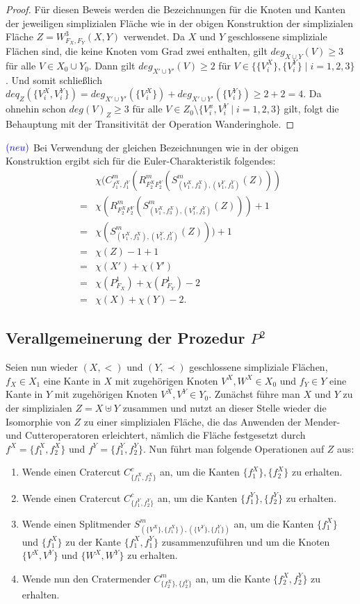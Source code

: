 \documentclass[12pt,titlepage]{article}
\begin{document}
 \begin{proof}
 Für diesen Beweis werden die Bezeichnungen für die Knoten und Kanten der jeweiligen simplizialen Fläche wie in der obigen Konstruktion der simplizialen Fläche $Z=W^3_{F_X,F_Y}(X,Y)$ verwendet.
 Da $X$ und $Y$ geschlossene simpliziale Flächen sind, die keine Knoten vom Grad zwei enthalten, gilt $deg_{X \cup Y}(V)\geq 3$ für alle $V\in X_0 \cup Y_0$.
  Dann gilt $deg_{X'\cup Y'}(V)\geq 2$ für $V \in \{\{V_i^X\},\{V_i^Y\}\mid i=1,2,3\}$. Und somit schließlich $deq_Z(\{V^X_i,V_i^Y\})=deg_{X'\cup Y'}(\{V_i^X\})+deg_{X'\cup Y'}(\{V_i^Y\})\geq 2+2=4$.
   Da ohnehin schon $deg(V)_Z\geq 3$ für alle $V\in Z_0\setminus \{V_i^x,V_i^Y\mid i=1,2,3\}$ gilt, folgt die Behauptung mit der Transitivität der Operation Wanderinghole.
 \end{proof}
$\textcolor{blue}{(neu)}$
Bei Verwendung der gleichen Bezeichnungen wie in der obigen Konstruktion ergibt sich für die Euler-Charakteristik folgendes:
\begin{align*}
&\chi(C^m_{f_1^X,f_1^Y}(R^m_{F_2^X F_2^Y}(S^m_{(V_1^X,f_3^X),(V_1^Y,f_3^Y)}(Z)))\\
=&\chi(R^m_{F_2^X F_2^Y}(S^m_{(V_1^X,f_3^X),(V_1^Y,f_3^Y)}(Z)))+1\\
=&\chi(S^m_{(V_1^X,f_3^X),(V_1^Y,f_3^Y)}(Z)))+1\\
=&\chi(Z)-1+1\\
=&\chi(X')+\chi(Y')\\
=&\chi(P^1_{F_X})+\chi(P^1_{F_Y})-2\\
=&\chi(X)+ \chi(Y)-2.
\end{align*}

  \subsection{Verallgemeinerung der Prozedur $P^2$}
Seien nun wieder $(X,<)$ und $(Y,\prec)$ geschlossene simpliziale Flächen, $f_X\in X_1$ eine Kante in $X$ mit zugehörigen Knoten $V^X,W^X \in X_0$ und $f_Y\in Y$ eine Kante in $Y$ mit zugehörigen Knoten $V^X,V^Y\in Y_0$. Zunächst führe man $X$ und $Y$ zu der simplizialen $Z=X \uplus Y$ zusammen und nutzt an dieser Stelle wieder die Isomorphie von $Z$ zu einer simplizialen Fläche, die das Anwenden der Mender- und Cutteroperatoren erleichtert, nämlich die Fläche festgesetzt durch $f^X=\{f_1^X,f^X_2\}$ und $f^Y=\{f_1^Y,f^Y_2\}$. Nun führt man folgende Operationen auf $Z$ aus:
\begin{enumerate}
 \item Wende einen Cratercut $C^c_{\{f_1^X,f_2^X\}}$ an, um die Kanten $\{f_1^X\},\{f_2^X\}$ zu erhalten.
 \item Wende einen Cratercut $C^c_{\{f_1^Y,f_2^Y\}}$ an, um die Kanten $\{f_1^Y\},\{{f_2^Y}\}$ zu erhalten.
\item Wende einen Splitmender $S^m_{(\{V^X\},\{f_1^X\}),(\{V^Y\},\{f_1^Y\})}$ an, um die Kanten $\{f_1^X\}$ und $\{{f_1^X}\}$ zu der Kante $\{f_1^X,f_1^Y\}$ zusammenzuführen und um die Knoten $\{V^X,V^Y\}$ und $\{W^X,W^Y\}$ zu erhalten.
 \item Wende nun den Cratermender $C^m_{\{f_2^X\},\{{f_2^Y}\}}$ an, um die Kante $\{f_2^X,f_2^Y\}$ zu erhalten.
 \end{enumerate}
 
\end{document}

